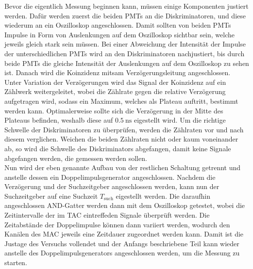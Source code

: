 Bevor die eigentlich Messung beginnen kann, müssen einige Komponenten justiert werden. Dafür werden zuerst die beiden PMTs an die Diskriminatoren, und diese wiederum an ein 
Oszilloskop angeschlossen. Damit sollten von beiden PMTs Impulse in Form von Auslenkungen auf dem Oszilloskop sichtbar sein, welche jeweils gleich stark sein müssen. 
Bei einer Abweichung der Intensität der Impulse der unterschiedlichen PMTs wird an den Diskriminatoren nachjustiert, bis durch beide PMTs die gleiche Intensität der Auslenkungen
auf dem Oszilloskop zu sehen ist. Danach wird die Koinzidenz mitsam Verzögerungsleitung angeschlossen. Unter Variation der Verzögerungen wird das Signal der Koinzidenz auf ein Zählwerk 
weitergeleitet, wobei die Zählrate gegen die relative Verzögerung aufgetragen wird, sodass ein Maximum, welches als Plateau auftritt, bestimmt werden kann. Optimalerweise sollte 
sich die Verzögerung in der Mitte des Plateaus befinden, weshalb diese auf $\SI{0.5}{\nano\second}$ eigestellt wird. Um die richtige Schwelle der Diskriminatoren zu überprüfen, werden die Zählraten vor und nach diesem verglichen. Weichen 
die beiden Zählraten nicht oder kaum voneinander ab, so wird die Schwelle des Diskriminators abgefangen, damit keine Signale abgefangen werden, die gemessen werden sollen. \\
Nun wird der eben genannte Aufbau von der restlichen Schaltung getrennt und anstelle dessen ein Doppelimpulsgenerator angeschlossen. Nachdem die Verzögerung und der 
Suchzeitgeber angeschlossen werden, kann nun der Suchzeitgeber auf eine Suchzeit $T_\text{such}$ eigestellt werden. Die daraufhin angeschlossen AND-Gatter werden dann mit dem 
Oszilloskop getestet, wobei die Zeitintervalle der im TAC eintreffeden Signale überprüft werden. Die Zeitabstände der Doppelimpulse können dann variiert werden, wodurch den 
Kanälen des MAC jeweils eine Zeitdauer zugeordnet werden kann. Damit ist die Justage des Versuchs vollendet und der Anfangs beschriebene Teil kann wieder anstelle des Doppelimpulsgenerators
angeschlossen werden, um die Messung zu starten.